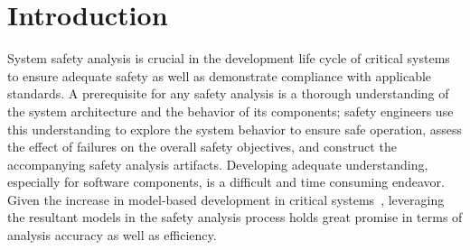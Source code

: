\section{Introduction}
\label{sec:intro}

System safety analysis is crucial in the development life cycle of critical systems to ensure adequate safety as well as demonstrate compliance with applicable standards. A prerequisite for any safety analysis is a thorough understanding of the system architecture and the behavior of its components; safety engineers use this understanding to explore the system behavior to ensure safe operation, assess the effect of failures on the overall safety objectives, and construct the accompanying safety analysis artifacts. Developing adequate understanding, especially for software components, is a difficult and time consuming endeavor. Given the increase in model-based development in critical systems~\cite{Joshi05:Dasc,CAV2015:BoCiGrMa,info17:HaLuHo,5979344,Gudemann:2010:FQQ:1909626.1909813}, leveraging the resultant models in the safety analysis process holds great promise in terms of analysis accuracy as well as efficiency.

